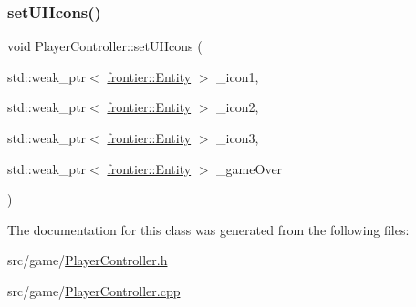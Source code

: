 \subsubsection{\texorpdfstring{set\+U\+I\+Icons()}{setUIIcons()}}
{\footnotesize\ttfamily void Player\+Controller\+::set\+U\+I\+Icons (\begin{DoxyParamCaption}\item[{std\+::weak\+\_\+ptr$<$ \hyperlink{classfrontier_1_1_entity}{frontier\+::\+Entity} $>$}]{\+\_\+icon1,  }\item[{std\+::weak\+\_\+ptr$<$ \hyperlink{classfrontier_1_1_entity}{frontier\+::\+Entity} $>$}]{\+\_\+icon2,  }\item[{std\+::weak\+\_\+ptr$<$ \hyperlink{classfrontier_1_1_entity}{frontier\+::\+Entity} $>$}]{\+\_\+icon3,  }\item[{std\+::weak\+\_\+ptr$<$ \hyperlink{classfrontier_1_1_entity}{frontier\+::\+Entity} $>$}]{\+\_\+game\+Over }\end{DoxyParamCaption})}



The documentation for this class was generated from the following files\+:\begin{DoxyCompactItemize}
\item 
src/game/\hyperlink{_player_controller_8h}{Player\+Controller.\+h}\item 
src/game/\hyperlink{_player_controller_8cpp}{Player\+Controller.\+cpp}\end{DoxyCompactItemize}

